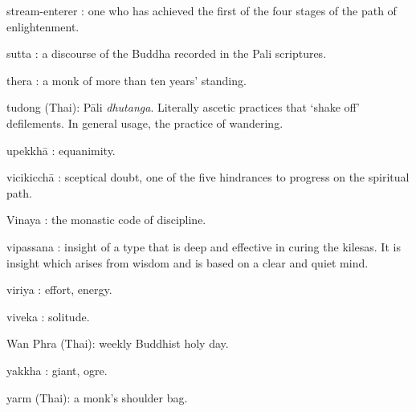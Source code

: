 stream-enterer : one who has achieved the first of the four stages of
the path of enlightenment.

sutta : a discourse of the Buddha recorded in the Pali scriptures.

thera : a monk of more than ten years' standing.

tudong (Thai): Pāli \emph{dhutanga}. Literally ascetic practices that
`shake off' defilements. In general usage, the practice of wandering.

upekkhā : equanimity.

vicikicchā : sceptical doubt, one of the five hindrances to progress on
the spiritual path.

Vinaya : the monastic code of discipline.

vipassana : insight of a type that is deep and effective in curing the
kilesas. It is insight which arises from wisdom and is based on a clear
and quiet mind.

viriya : effort, energy.

viveka : solitude.

Wan Phra (Thai): weekly Buddhist holy day.

yakkha : giant, ogre.

yarm (Thai): a monk's shoulder bag.
